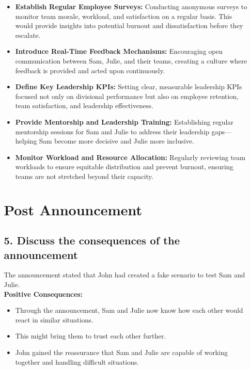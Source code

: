 \documentclass[a4paper,10pt]{article}
\begin{document}
\begin{itemize}
    \item \textbf{Establish Regular Employee Surveys:} Conducting anonymous surveys to monitor team morale, workload, and satisfaction on a regular basis. This would provide insights into potential burnout and dissatisfaction before they escalate.
    \item \textbf{Introduce Real-Time Feedback Mechanisms:} Encouraging open communication between Sam, Julie, and their teams, creating a culture where feedback is provided and acted upon continuously.
    \item \textbf{Define Key Leadership KPIs:} Setting clear, measurable leadership KPIs focused not only on divisional performance but also on employee retention, team satisfaction, and leadership effectiveness.
    \item \textbf{Provide Mentorship and Leadership Training:} Establishing regular mentorship sessions for Sam and Julie to address their leadership gaps—helping Sam become more decisive and Julie more inclusive.
    \item \textbf{Monitor Workload and Resource Allocation:} Regularly reviewing team workloads to ensure equitable distribution and prevent burnout, ensuring teams are not stretched beyond their capacity.
\end{itemize}


\section{Post Announcement}
\subsection{5. Discuss the consequences of the announcement}
The announcement stated that John had created a fake scenario to test Sam and Julie.\\

\textbf{Positive Consequences:}
\begin{itemize}
    \item Through the announcement, Sam and Julie now know how each other would react in similar situations.
    \item This might bring them to trust each other further.
    \item John gained the reassurance that Sam and Julie are capable of working together and handling difficult situations.
\end{itemize}
\end{document}
